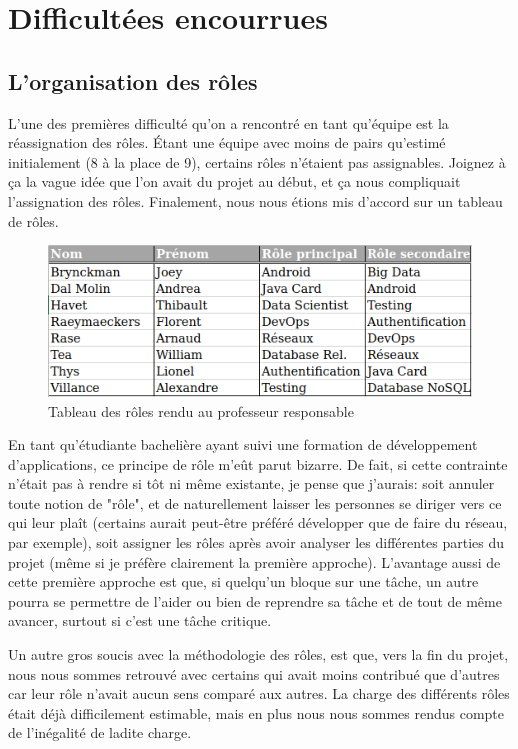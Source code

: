 \section{Difficultées encourrues}

\subsection{L'organisation des rôles}

L'une des premières difficulté qu'on a rencontré en tant qu'équipe est la réassignation des rôles. Étant une équipe avec moins de pairs qu'estimé initialement (8 à la place de 9), certains rôles n'étaient pas assignables. Joignez à ça la vague idée que l'on avait du projet au début, et ça nous compliquait l'assignation des rôles. Finalement, nous nous étions mis d'accord sur un tableau de rôles.

\begin{figure}[H]
    \centering
    \includegraphics[width=\textwidth]{./img/roles.png}
    \caption{Tableau des rôles rendu au professeur responsable}
    \label{fig:roles}
\end{figure}

En tant qu'étudiante bachelière ayant suivi une formation de développement d'applications, ce principe de rôle m'eût parut bizarre. De fait, si cette contrainte n'était pas à rendre si tôt ni même existante, je pense que j'aurais: soit annuler toute notion de "rôle", et de naturellement laisser les personnes se diriger vers ce qui leur plaît (certains aurait peut-être préféré développer que de faire du réseau, par exemple), soit assigner les rôles après avoir analyser les différentes parties du projet (même si je préfère clairement la première approche). L'avantage aussi de cette première approche est que, si quelqu'un bloque sur une tâche, un autre pourra se permettre de l'aider ou bien de reprendre sa tâche et de tout de même avancer, surtout si c'est une tâche critique.

Un autre gros soucis avec la méthodologie des rôles, est que, vers la fin du projet, nous nous sommes retrouvé avec certains qui avait moins contribué que d'autres car leur rôle n'avait aucun sens comparé aux autres. La charge des différents rôles était déjà difficilement estimable, mais en plus nous nous sommes rendus compte de l'inégalité de ladite charge.

